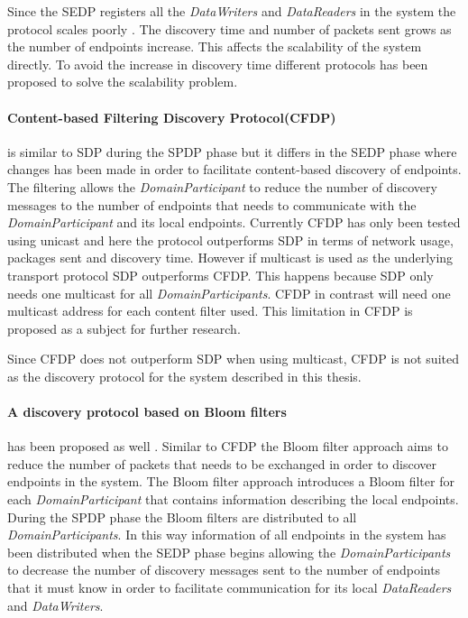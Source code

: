Since the SEDP registers all the \textit{DataWriters} and \textit{DataReaders} in the system the protocol scales poorly \cite{(CFDP)}. The discovery time and number of packets sent grows as the number of endpoints increase. This affects the scalability of the system directly. To avoid the increase in discovery time different protocols has been proposed to solve the scalability problem. 

\paragraph{Content-based Filtering Discovery Protocol(CFDP)} is similar to SDP during the SPDP phase but it differs in the SEDP phase where changes has been made in order to facilitate content-based discovery of endpoints. The filtering allows the \textit{DomainParticipant} to reduce the number of discovery messages to the number of endpoints that needs to communicate with the \textit{DomainParticipant} and its local endpoints. Currently CFDP has only been tested using unicast and here the protocol outperforms SDP in terms of network usage, packages sent and discovery time. However if multicast is used as the underlying transport protocol SDP outperforms CFDP. This happens because SDP only needs one multicast for all \textit{DomainParticipants}. CFDP in contrast will need one multicast address for each content filter used. This limitation in CFDP is proposed as a subject for further research.

Since CFDP does not outperform SDP when using multicast, CFDP is not suited as the discovery protocol for the system described in this thesis.

\paragraph{A discovery protocol based on Bloom filters} has been proposed as well \cite{monedero2009dds}. Similar to CFDP the Bloom filter approach aims to reduce the number of packets that needs to be exchanged in order to discover endpoints in the system. The Bloom filter approach introduces a Bloom filter for each \textit{DomainParticipant} that contains information describing the local endpoints. During the SPDP phase the Bloom filters are distributed to all \textit{DomainParticipants}. In this way information of all endpoints in the system has been distributed when the SEDP phase begins allowing the \textit{DomainParticipants} to decrease the number of discovery messages sent to the number of endpoints that it must know in order to facilitate communication for its local \textit{DataReaders} and \textit{DataWriters}. 

